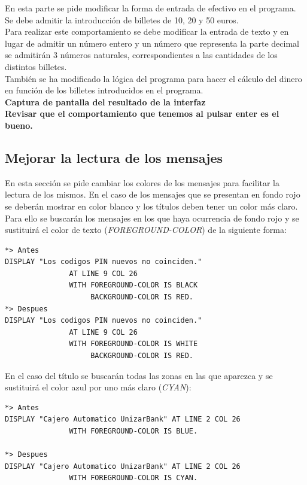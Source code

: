 \documentclass[10pt,a4paper]{article}
\begin{document}
En esta parte se pide modificar la forma de entrada de efectivo en el programa. Se debe admitir la introducción de billetes de 10, 20 y 50 euros.\\
Para realizar este comportamiento se debe modificar la entrada de texto y en lugar de admitir un número entero y un número que representa la parte decimal se admitirán 3 números naturales, correspondientes a las cantidades de los distintos billetes.\\
También se ha modificado la lógica del programa para hacer el cálculo del dinero en función de los billetes introducidos en el programa.\\

\textbf{{\Huge Captura de pantalla del resultado de la interfaz}}\\


\textbf{{\Huge Revisar que el comportamiento que tenemos al pulsar enter es el bueno.}}


\subsection{Mejorar la lectura de los mensajes}

En esta sección se pide cambiar los colores de los mensajes para facilitar la lectura de los mismos. En el caso de los mensajes que se presentan en fondo rojo se deberán mostrar en color blanco y los títulos deben tener un color más claro.\\

Para ello se buscarán los mensajes en los que haya ocurrencia de fondo rojo y se sustituirá el color de texto (\emph{FOREGROUND-COLOR}) de la siguiente forma:

\newpage
\begin{lstlisting}
*> Antes
DISPLAY "Los codigos PIN nuevos no coinciden." 
               AT LINE 9 COL 26
               WITH FOREGROUND-COLOR IS BLACK
                    BACKGROUND-COLOR IS RED.
*> Despues
DISPLAY "Los codigos PIN nuevos no coinciden." 
               AT LINE 9 COL 26
               WITH FOREGROUND-COLOR IS WHITE
                    BACKGROUND-COLOR IS RED.
\end{lstlisting}

En el caso del título se buscarán todas las zonas en las que aparezca y se sustituirá el color azul por uno más claro (\emph{CYAN}):

\begin{lstlisting}
*> Antes
DISPLAY "Cajero Automatico UnizarBank" AT LINE 2 COL 26
               WITH FOREGROUND-COLOR IS BLUE.

*> Despues
DISPLAY "Cajero Automatico UnizarBank" AT LINE 2 COL 26
               WITH FOREGROUND-COLOR IS CYAN.
\end{lstlisting}
\end{document}
